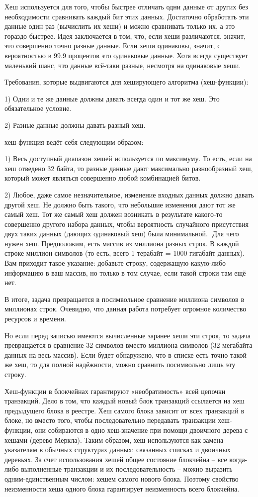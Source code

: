 \documentclass[och, master, pract]{SCWorks_fix}
\theoremstyle{plain}
\theoremstyle{plain}
\theoremstyle{plain}
\theoremstyle{definition}
\begin{document}
Хеш используется для того, чтобы быстрее отличать одни данные от других без необходимости сравнивать каждый бит этих данных. Достаточно обработать эти данные один раз (вычислить их хеши) и можно сравнивать только их, а это гораздо быстрее. Идея заключается в том, что, если хеши различаются, значит, это совершенно точно разные данные. Если хеши одинаковы, значит, с вероятностью в 99.9 процентов это одинаковые данные. Хотя всегда существует маленький шанс, что данные всё-таки разные, несмотря на одинаковые хеши.

Требования, которые выдвигаются для хеширующего алгоритма (хеш-функции):

1) Одни и те же данные должны давать всегда один и тот же хеш. Это обязательное условие.

2) Разные данные должны давать разный хеш. 

 хеш-функция ведёт себя следующим образом:

1) Весь доступный диапазон хешей используется по максимуму. То есть, если на хеш отведено 32 байта, то разные данные дают максимально разнообразный хеш, который может являться совершенно любой комбинацией битов. 

2) Любое, даже самое незначительное, изменение входных данных должно давать другой хеш. Не должно быть такого, что небольшие изменения дают тот же самый хеш. Тот же самый хеш должен возникать в результате какого-то совершенно другого набора данных, чтобы вероятность случайного присутствия двух таких данных (дающих одинаковый хеш) была минимальной.  	
Для чего нужен хеш. Предположим, есть массив из миллиона разных строк. В каждой строке миллион символов (то есть, всего 1 терабайт = 1000 гигабайт данных). Вам приходит такое указание: добавьте строку, содержащую какую-либо информацию в ваш массив, но только в том случае, если такой строки там ещё нет.

В итоге, задача превращается в посимвольное сравнение миллиона символов в миллионах строк. Очевидно, что данная работа потребует огромное количество ресурсов и времени.

Но если перед записью имеются вычисленные заранее хеши эти строк, то задача превращается в сравнение 32 символов вместо миллиона символов (32 мегабайта данных на весь массив). Если будет обнаружено, что в списке есть точно такой же хеш, то для полной надёжности, можно сравнить посимвольно лишь эту строку. 

Хеш-функции в блокчейнах гарантируют «необратимость» всей цепочки транзакций. Дело в том, что каждый новый блок транзакций ссылается на хеш предыдущего блока в реестре. Хеш самого блока зависит от всех транзакций в блоке, но вместо того, чтобы последовательно передавать транзакции хеш-функции, они собираются в одно хеш-значение при помощи двоичного дерева с хешами (дерево Меркла). Таким образом, хеш используются как замена указателям в обычных структурах данных: связанных списках и двоичных деревьях. За счет использования хешей общее состояние блокчейна – все когда-либо выполненные транзакции и их последовательность – можно выразить одним-единственным числом: хешем самого нового блока. Поэтому свойство неизменности хеша одного блока гарантирует неизменность всего блокчейна.\cite{bib:block:2}
\end{document}
